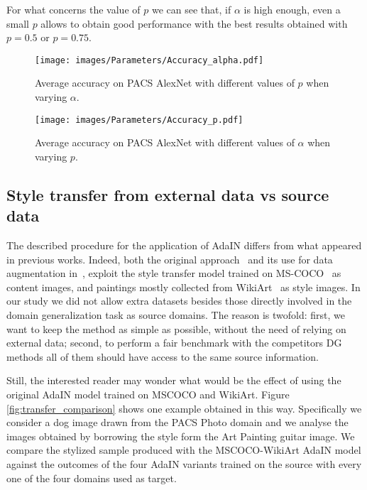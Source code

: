 For what concerns the value of $p$ we can see that, if $\alpha$ is high enough, even a small $p$ allows to obtain good performance with the best results obtained with $p=0.5$ or $p=0.75$.

\begin{figure}
    \centering
    \texttt{[image: images/Parameters/Accuracy\_alpha.pdf]}\vspace{-5mm}
    \caption{Average accuracy on PACS AlexNet with different values of $p$ when varying $\alpha$.} 
    \label{fig:varying_alpha}\vspace{-5mm}
\end{figure}
\begin{figure}
    \centering
    \texttt{[image: images/Parameters/Accuracy\_p.pdf]}\vspace{-5mm}
    \caption{Average accuracy on PACS AlexNet with different values of $\alpha$ when varying $p$.}
    \label{fig:varying_p} \vspace{-5mm}
\end{figure}


\subsection{Style transfer from external data vs source data} 
The described procedure for the application of AdaIN differs from what appeared in previous works. Indeed, both the original approach~\cite{Huang_2017_ICCV_adain} and its use for data augmentation in~\cite{zhang2020learning}, exploit the style transfer model trained on MS-COCO~\cite{mscoco} as content images, and paintings mostly collected from WikiArt~\cite{wikiart} as style images. In our study we did not allow extra datasets besides those directly involved in the domain generalization task as source domains. The reason is twofold: first, we want to keep the method as simple as possible, without the need of relying on external data; second, to perform a fair benchmark with the competitors DG methods all of them should have access to the same source information. 

Still, the interested reader may wonder what would be the effect of using the original AdaIN model trained on MSCOCO and WikiArt. Figure \ref{fig:transfer_comparison} shows one example obtained in this way. Specifically we consider a dog image drawn from the PACS Photo domain and we analyse the images obtained by borrowing the style form the Art Painting guitar image. 
We compare the stylized sample produced with the MSCOCO-WikiArt AdaIN model against the outcomes of the four AdaIN variants trained on the source with every one of the four domains used as target. 

